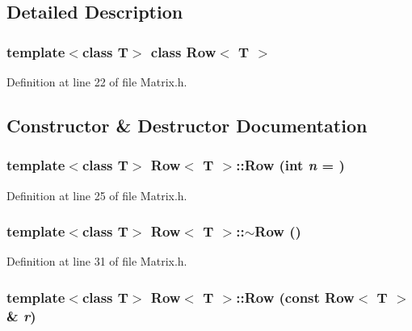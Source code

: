 \subsection{Detailed Description}
\subsubsection*{template$<$class T$>$ class Row$<$ T $>$}



Definition at line 22 of file Matrix.h.



\subsection{Constructor \& Destructor Documentation}
\hypertarget{classRow_aad13a5275c04ed243620bb02164806a1}{
\subsubsection[{Row}]{\setlength{\rightskip}{0pt plus 5cm}template$<$class T$>$ {\bf Row}$<$ T $>$::{\bf Row} (int {\em n} = {})}}
\label{classRow_aad13a5275c04ed243620bb02164806a1}


Definition at line 25 of file Matrix.h.

\hypertarget{classRow_a8e888a33060156cd2e3757a95e9feee1}{
\subsubsection[{$\sim$Row}]{\setlength{\rightskip}{0pt plus 5cm}template$<$class T$>$ {\bf Row}$<$ T $>$::$\sim${\bf Row} ()}}
\label{classRow_a8e888a33060156cd2e3757a95e9feee1}


Definition at line 31 of file Matrix.h.

\hypertarget{classRow_a3c76905ddd4522c92da0d8a9e24a22a1}{
\subsubsection[{Row}]{\setlength{\rightskip}{0pt plus 5cm}template$<$class T$>$ {\bf Row}$<$ T $>$::{\bf Row} (const {\bf Row}$<$ T $>$ \& {\em r})}}
\label{classRow_a3c76905ddd4522c92da0d8a9e24a22a1}


